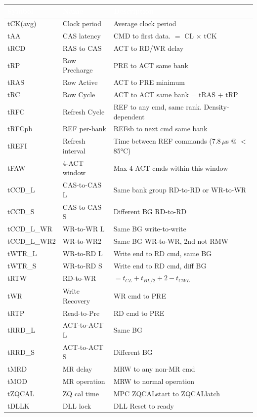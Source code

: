 \documentclass[10pt,a4paper,twoside]{article}
\newcommand{\thd}[1]{\cellcolor{navyblue}\textcolor{white}{\textbf{#1}}}
\newcommand{\trow}{\rowcolor{lightgray}}
\newcommand{\talt}{\rowcolor{skyblue!30}}
\begin{document}
\begin{center}
\begin{tabularx}{\linewidth}{@{} l l X @{}}
\toprule
\thd{Symbol} & \thd{Name} & \thd{Description} \\
\midrule
\trow tCK(avg) & Clock period & Average clock period \\
\talt tAA & CAS latency & CMD to first data. $=$ CL $\times$ tCK \\
\trow tRCD & RAS to CAS & ACT to RD/WR delay \\
\talt tRP & Row Precharge & PRE to ACT same bank \\
\trow tRAS & Row Active & ACT to PRE minimum \\
\talt tRC & Row Cycle & ACT to ACT same bank = tRAS + tRP \\
\trow tRFC & Refresh Cycle & REF to any cmd, same rank. Density-dependent \\
\talt tRFCpb & REF per-bank & REFsb to next cmd same bank \\
\trow tREFI & Refresh interval & Time between REF commands (7.8\,$\mu$s @ $<$85°C) \\
\talt tFAW & 4-ACT window & Max 4 ACT cmds within this window \\
\trow tCCD\_L & CAS-to-CAS L & Same bank group RD-to-RD or WR-to-WR \\
\talt tCCD\_S & CAS-to-CAS S & Different BG RD-to-RD \\
\trow tCCD\_L\_WR & WR-to-WR L & Same BG write-to-write \\
\talt tCCD\_L\_WR2 & WR-to-WR2 & Same BG WR-to-WR, 2nd not RMW \\
\trow tWTR\_L & WR-to-RD L & Write end to RD cmd, same BG \\
\talt tWTR\_S & WR-to-RD S & Write end to RD cmd, diff BG \\
\trow tRTW & RD-to-WR & $= t_{CL} + t_{BL/2} + 2 - t_{CWL}$ \\
\talt tWR & Write Recovery & WR cmd to PRE \\
\trow tRTP & Read-to-Pre & RD cmd to PRE \\
\talt tRRD\_L & ACT-to-ACT L & Same BG \\
\trow tRRD\_S & ACT-to-ACT S & Different BG \\
\talt tMRD & MR delay & MRW to any non-MR cmd \\
\trow tMOD & MR operation & MRW to normal operation \\
\talt tZQCAL & ZQ cal time & MPC ZQCALstart to ZQCALlatch \\
\trow tDLLK & DLL lock & DLL Reset to ready \\
\bottomrule
\end{tabularx}
\end{center}
\end{document}
